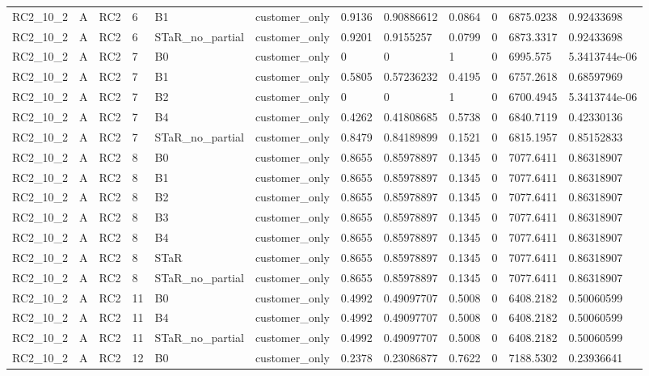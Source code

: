 \begin{longtable}{llllllllllll}
RC2\_10\_2 & A & RC2 & 6 & B1 & customer\_only & 0.9136 & 0.90886612 & 0.0864 & 0 & 6875.0238 & 0.92433698 \\
RC2\_10\_2 & A & RC2 & 6 & STaR\_no\_partial & customer\_only & 0.9201 & 0.9155257 & 0.0799 & 0 & 6873.3317 & 0.92433698 \\
RC2\_10\_2 & A & RC2 & 7 & B0 & customer\_only & 0 & 0 & 1 & 0 & 6995.575 & 5.3413744e-06 \\
RC2\_10\_2 & A & RC2 & 7 & B1 & customer\_only & 0.5805 & 0.57236232 & 0.4195 & 0 & 6757.2618 & 0.68597969 \\
RC2\_10\_2 & A & RC2 & 7 & B2 & customer\_only & 0 & 0 & 1 & 0 & 6700.4945 & 5.3413744e-06 \\
RC2\_10\_2 & A & RC2 & 7 & B4 & customer\_only & 0.4262 & 0.41808685 & 0.5738 & 0 & 6840.7119 & 0.42330136 \\
RC2\_10\_2 & A & RC2 & 7 & STaR\_no\_partial & customer\_only & 0.8479 & 0.84189899 & 0.1521 & 0 & 6815.1957 & 0.85152833 \\
RC2\_10\_2 & A & RC2 & 8 & B0 & customer\_only & 0.8655 & 0.85978897 & 0.1345 & 0 & 7077.6411 & 0.86318907 \\
RC2\_10\_2 & A & RC2 & 8 & B1 & customer\_only & 0.8655 & 0.85978897 & 0.1345 & 0 & 7077.6411 & 0.86318907 \\
RC2\_10\_2 & A & RC2 & 8 & B2 & customer\_only & 0.8655 & 0.85978897 & 0.1345 & 0 & 7077.6411 & 0.86318907 \\
RC2\_10\_2 & A & RC2 & 8 & B3 & customer\_only & 0.8655 & 0.85978897 & 0.1345 & 0 & 7077.6411 & 0.86318907 \\
RC2\_10\_2 & A & RC2 & 8 & B4 & customer\_only & 0.8655 & 0.85978897 & 0.1345 & 0 & 7077.6411 & 0.86318907 \\
RC2\_10\_2 & A & RC2 & 8 & STaR & customer\_only & 0.8655 & 0.85978897 & 0.1345 & 0 & 7077.6411 & 0.86318907 \\
RC2\_10\_2 & A & RC2 & 8 & STaR\_no\_partial & customer\_only & 0.8655 & 0.85978897 & 0.1345 & 0 & 7077.6411 & 0.86318907 \\
RC2\_10\_2 & A & RC2 & 11 & B0 & customer\_only & 0.4992 & 0.49097707 & 0.5008 & 0 & 6408.2182 & 0.50060599 \\
RC2\_10\_2 & A & RC2 & 11 & B4 & customer\_only & 0.4992 & 0.49097707 & 0.5008 & 0 & 6408.2182 & 0.50060599 \\
RC2\_10\_2 & A & RC2 & 11 & STaR\_no\_partial & customer\_only & 0.4992 & 0.49097707 & 0.5008 & 0 & 6408.2182 & 0.50060599 \\
RC2\_10\_2 & A & RC2 & 12 & B0 & customer\_only & 0.2378 & 0.23086877 & 0.7622 & 0 & 7188.5302 & 0.23936641 \\

\end{longtable}
